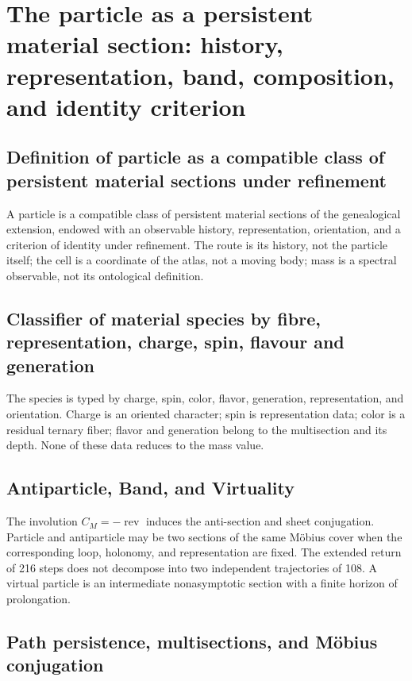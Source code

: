 \chapter{The particle as a persistent material section: history, representation, band, composition, and identity criterion}
\label{chap:particula-seccion-material-persistente}

\section{Definition of particle as a compatible class of persistent material sections under refinement}
A particle is a compatible class of persistent material sections of the genealogical extension, endowed with an observable history, representation, orientation, and a criterion of identity under refinement. The route is its history, not the particle itself; the cell is a coordinate of the atlas, not a moving body; mass is a spectral observable, not its ontological definition.

\section{Classifier of material species by fibre, representation, charge, spin, flavour and generation}
The species is typed by charge, spin, color, flavor, generation,
representation, and orientation. Charge is an oriented character; spin is
representation data; color is a residual ternary fiber; flavor and
generation belong to the multisection and its depth. None of these
data reduces to the mass value.

\section{Antiparticle, Band, and Virtuality}
The involution \(C_M=-\operatorname{rev}\) induces the anti-section and
sheet conjugation. Particle and antiparticle may be two sections of the
same Möbius cover when the corresponding loop, holonomy, and
representation are fixed. The extended return of 216 steps does not
decompose into two independent trajectories of 108. A virtual particle is
an intermediate nonasymptotic section with a finite horizon of prolongation.

\section{Path persistence, multisections, and Möbius conjugation}

